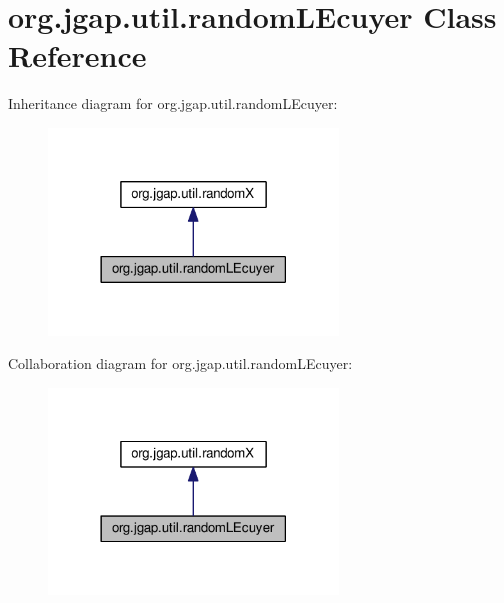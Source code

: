 \hypertarget{classorg_1_1jgap_1_1util_1_1random_l_ecuyer}{\section{org.\-jgap.\-util.\-random\-L\-Ecuyer Class Reference}
\label{classorg_1_1jgap_1_1util_1_1random_l_ecuyer}
}


Inheritance diagram for org.\-jgap.\-util.\-random\-L\-Ecuyer\-:
\nopagebreak
\begin{figure}[H]
\begin{center}
\leavevmode
\includegraphics[width=218pt]{classorg_1_1jgap_1_1util_1_1random_l_ecuyer__inherit__graph}
\end{center}
\end{figure}


Collaboration diagram for org.\-jgap.\-util.\-random\-L\-Ecuyer\-:
\nopagebreak
\begin{figure}[H]
\begin{center}
\leavevmode
\includegraphics[width=218pt]{classorg_1_1jgap_1_1util_1_1random_l_ecuyer__coll__graph}
\end{center}
\end{figure}
